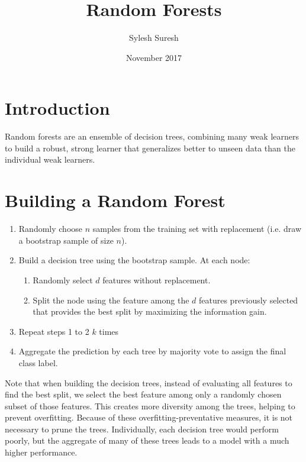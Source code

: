 \documentclass{article}
\title{Random Forests}
\author{Sylesh Suresh}
\date{November 2017}
\begin{document}
\maketitle

\section{Introduction}
Random forests are an ensemble of decision trees, combining many weak learners to build a robust, strong learner that generalizes better to unseen data than the individual weak learners. 
\section{Building a Random Forest}
\begin{enumerate}
    \item Randomly choose $n$ samples from the training set with replacement (i.e. draw a bootstrap sample of size $n$).
    \item Build a decision tree using the bootstrap sample. At each node:
    \begin{enumerate}
        \item Randomly select $d$ features without replacement.
        \item Split the node using the feature among the $d$ features previously selected that provides the best split by maximizing the information gain.
    \end{enumerate}
    \item Repeat steps 1 to 2 $k$ times
    \item Aggregate the prediction by each tree by majority vote to assign the final class label.
\end{enumerate}
Note that when building the decision trees, instead of evaluating all features to find the best split, we select the best feature among only a randomly chosen subset of those features. This creates more diversity among the trees, helping to prevent overfitting. Because of these overfitting-preventative measures, it is not necessary to prune the trees. Individually, each decision tree would perform poorly, but the aggregate of many of these trees leads to a model with a much higher performance.
\end{document}
